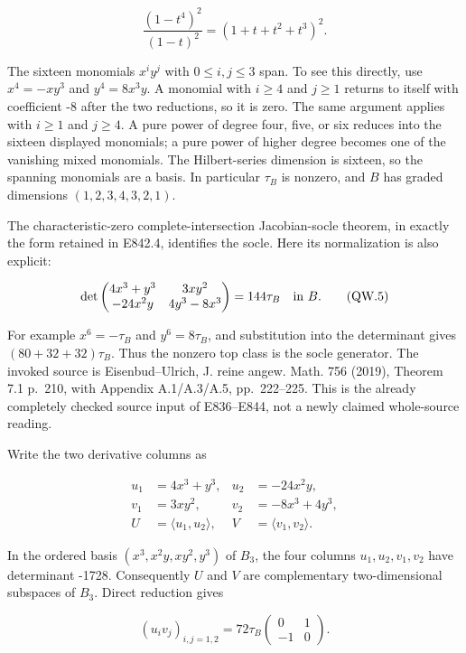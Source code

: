 \[
 \frac{(1-t^4)^2}{(1-t)^2}
       =(1+t+t^2+t^3)^2.
\tag{QW.4}
\]

The sixteen monomials \(x^iy^j\) with \(0\le i,j\le3\) span. To see this directly,
use \(x^4=-xy^3\) and \(y^4=8x^3y\). A monomial with \(i\ge4\) and \(j\ge1\) returns to
itself with coefficient -8 after the two reductions, so it is zero.
The same argument applies with \(i\ge1\) and \(j\ge4\). A pure power of degree
four, five, or six reduces into the sixteen displayed monomials; a pure
power of higher degree becomes one of the vanishing mixed monomials.
The Hilbert-series dimension is sixteen, so the spanning monomials are
a basis. In particular \(\tau_B\) is nonzero, and \(B\) has graded dimensions
\((1,2,3,4,3,2,1)\).

The characteristic-zero complete-intersection Jacobian-socle theorem,
in exactly the form retained in E842.4, identifies the socle. Here its
normalization is also explicit:

\[
 \det\begin{pmatrix}
 4x^3+y^3&3xy^2\\
 -24x^2y&4y^3-8x^3
 \end{pmatrix}=144\tau_B\quad\hbox{in }B.
\tag{QW.5}
\]

For example \(x^6=-\tau_B\) and \(y^6=8\tau_B\), and substitution into the
determinant gives \((80+32+32)\tau_B\). Thus the nonzero top class is the
socle generator. The invoked source is Eisenbud--Ulrich, J. reine
angew. Math. 756 (2019), Theorem 7.1 p.~210, with Appendix A.1/A.3/A.5,
pp.~222--225.\cite{SFEisenbudUlrich2019} This is the already completely checked source input of
E836--E844, not a newly claimed whole-source reading.

Write the two derivative columns as

\[
 \begin{split}
 u_1&=4x^3+y^3,&u_2&=-24x^2y,\\
 v_1&=3xy^2,&v_2&=-8x^3+4y^3,\\
 U&=\langle u_1,u_2\rangle,&V&=\langle v_1,v_2\rangle.
 \end{split}
\tag{QW.6}
\]

In the ordered basis \((x^3,x^2y,xy^2,y^3)\) of \(B_3\), the four columns
\(u_1,u_2,v_1,v_2\) have determinant -1728. Consequently \(U\) and \(V\) are
complementary two-dimensional subspaces of \(B_3\). Direct reduction gives

\[
 (u_i v_j)_{i,j=1,2}
       =72\tau_B\begin{pmatrix}0&1\\-1&0\end{pmatrix}.
\tag{QW.7}
\]

